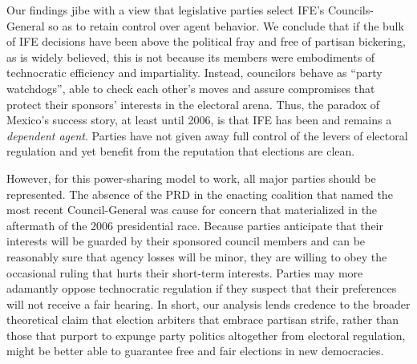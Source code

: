 \documentclass[12 pt, letter]{article}
\begin{document}
Our findings jibe with a view that legislative parties select IFE's Councils-General so as to retain control over agent behavior.  We conclude that if the bulk of IFE decisions have been above the political fray and free of partisan bickering, as is widely believed, this is not because its members were embodiments of technocratic efficiency and impartiality.  Instead, councilors behave as ``party watchdogs'', able to check each other's moves and assure compromises that protect their sponsors' interests in the electoral arena.  Thus, the paradox of Mexico's success story, at least until 2006, is that IFE has been and remains a \emph{dependent agent}.  Parties have not given away full control of the levers of electoral regulation and yet benefit from the reputation that elections are clean.

However, for this power-sharing model to work, all major parties should be represented. The absence of the PRD in the enacting coalition that named the most recent Council-General was cause for concern that materialized in the aftermath of the 2006 presidential race. Because parties anticipate that their interests will be guarded by their sponsored council members and can be reasonably sure that agency losses will be minor, they are willing to obey the occasional ruling that hurts their short-term interests. Parties may more adamantly oppose technocratic regulation if they suspect that their preferences will not receive a fair hearing.  In short, our analysis lends credence to the broader theoretical claim that election arbiters that embrace partisan strife, rather than those that purport to expunge party politics altogether from electoral regulation, might be better able to guarantee free and fair elections in new democracies.

\end{document}
